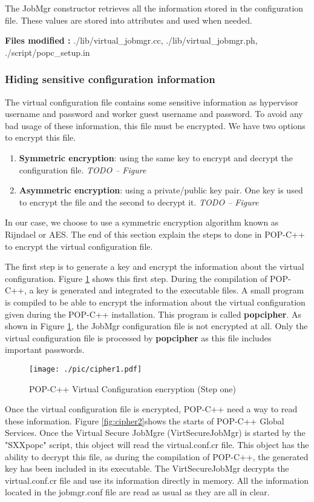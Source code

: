 The JobMgr constructor retrieves all the information stored in the configuration file. These values are stored into attributes and used when needed.\s

\textbf{Files modified : } ./lib/virtual\_jobmgr.cc, ./lib/virtual\_jobmgr.ph, ./script/popc\_setup.in

\subsubsection{Hiding sensitive configuration information}
The virtual configuration file contains some sensitive information as hypervisor username and password and worker guest username and password. To avoid any bad usage of these information, this file must be encrypted. We have two options to encrypt this file. 

\begin{enumerate}
\item \textbf{Symmetric encryption}: using the same key to encrypt and decrypt the configuration file. \textit{TODO -- Figure}
\item \textbf{Asymmetric encryption}: using a private/public key pair. One key is used to encrypt the file and the second to decrypt it. \textit{TODO -- Figure} 
\end{enumerate}

In our case, we choose to use a symmetric encryption algorithm known as Rijndael or AES. The end of this section explain the steps to done in POP-C++ to encrypt the virtual configuration file. \s

The first step is to generate a key and encrypt the information about the virtual configuration. Figure \ref{fig:cipher1} shows this first step. During the compilation of POP-C++, a key is generated and integrated to the executable files. A small program is compiled to be able to encrypt the information about the virtual configuration given during the POP-C++ installation. This program is called \textbf{popcipher}. As shown in Figure \ref{fig:cipher1}, the JobMgr configuration file is not encrypted at all. Only the virtual configuration file is processed by \textbf{popcipher} as this file includes important passwords. 


\begin{figure}[ht]
	\caption{POP-C++ Virtual Configuration encryption (Step one)}
  	\centering
	\texttt{[image: ./pic/cipher1.pdf]}
	\label{fig:cipher1}
\end{figure}

Once the virtual configuration file is encrypted, POP-C++ need a way to read these information. Figure \ref{fig:cipher2}shows the starts of POP-C++ Global Services. Once the Virtual Secure JobMgre (VirtSecureJobMgr) is started by the "SXXpopc" script, this object will read the virtual.conf.cr file. This object has the ability to decrypt this file, as during the compilation of POP-C++, the generated key has been included in its executable. The VirtSecureJobMgr decrypts the virtual.conf.cr file and use its information directly in memory. All the information located in the jobmgr.conf file are read as usual as they are all in clear.


